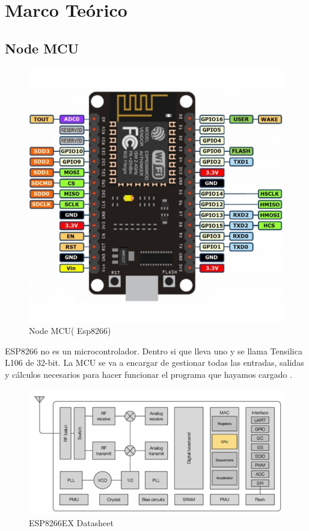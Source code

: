 \documentclass[10pt,a4paper]{article}
\begin{document}
\section{Marco Teórico}
\begin{multicols}{2}
\subsection{Node MCU}

\begin{figure}[H]
\centering
\includegraphics[scale=0.3]{nodemcu-v3-esp8266.jpg}
\caption{Node MCU( Esp8266)}
\end{figure}
ESP8266 no es un microcontrolador. Dentro si que lleva uno y se llama Tensilica L106 de 32-bit. La MCU se va a encargar de gestionar todas las entradas, salidas y cálculos necesarios para hacer funcionar el programa que hayamos cargado \cite{boylestad2003electronica}.
\begin{figure}[H]
\centering
\includegraphics[scale=0.4]{8266.PNG}
\caption{ ESP8266EX Datasheet}
\end{figure}


\end{multicols}
\end{document}
